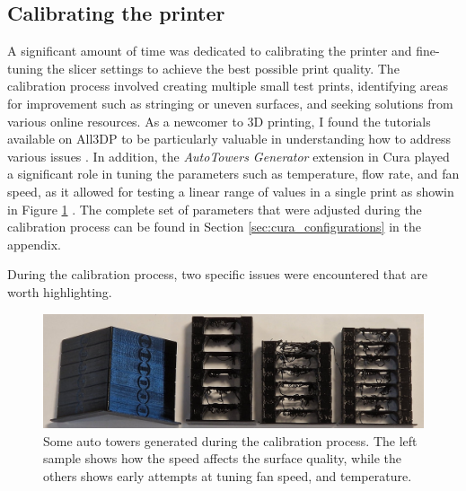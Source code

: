 \subsection{Calibrating the printer}

A significant amount of time was dedicated to calibrating the printer and fine-tuning the slicer settings to achieve the best possible print quality.
The calibration process involved creating multiple small test prints, identifying areas for improvement such as stringing or uneven surfaces, and seeking solutions from various online resources.
As a newcomer to 3D printing, I found the tutorials available on All3DP to be particularly valuable in understanding how to address various issues \cite{all3dpBasicsArchives}.
In addition, the \textit{AutoTowers Generator} extension in Cura played a significant role in tuning the parameters such as temperature, flow rate, and fan speed, as it allowed for testing a linear range of values in a single print as showin in Figure \ref{fig:auto_towers} \cite{kartchnerAutoTowersGeneratorUltimaker2022}.
The complete set of parameters that were adjusted during the calibration process can be found in Section \ref{sec:cura_configurations} in the appendix.

During the calibration process, two specific issues were encountered that are worth highlighting.

\begin{figure}[H]
    \centering
    \includegraphics[width=\textwidth]{figures/3d_print/auto_towers.jpg}
    \caption{Some auto towers generated during the calibration process.
        The left sample shows how the speed affects the surface quality, while the others shows early attempts at tuning fan speed, and temperature.}
    \label{fig:auto_towers}
\end{figure}


